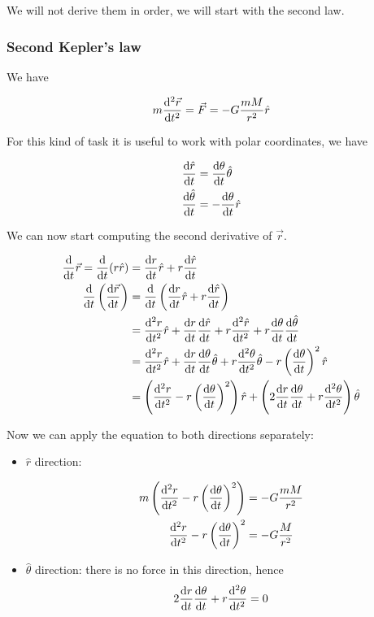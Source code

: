 \documentclass[10pt]{extarticle}
\begin{document}
We will not derive them in order, we will start with the second law.

\subsubsection{Second Kepler's law}

We have

$$
    m \dv[2]{\vec r}{t} = \vec F = - G \frac{m M}{r^2} \hat r
$$

For this kind of task it is useful to work with polar coordinates, we have

\begin{align*}
    \dv{\hat r}{t}       & = \dv{\theta}{t} \hat \theta \\
    \dv {\hat \theta}{t} & = - \dv{\theta}{t} \hat r
\end{align*}

We can now start computing the second derivative of $\vec r$.

\begin{align*}
    \dv{t} \vec{r} = \dv{t} (r \hat r) & = \dv{r}{t} \hat r + r \dv{\hat r}{t}                                                                                                            \\
    \dv{t}\left(\dv{\vec{r}}{t}\right) & = \dv{t}\left(\dv{r}{t} \hat r + r \dv{\hat r}{t}\right)                                                                                         \\
                                       & = \dv[2]{r}{t} \hat r + \dv{r}{t} \dv{\hat r}{t} + r \dv[2]{\hat r}{t} + r \dv{\theta}{t} \dv{\hat \theta}{t}                                    \\
                                       & = \dv[2]{r}{t} \hat r + \dv{r}{t} \dv{\theta}{t} \hat \theta + r \dv[2]{\theta}{t} \hat \theta - r \left(\dv{\theta}{t}\right)^2 \hat r          \\
                                       & = \left(\dv[2]{r}{t} - r \left(\dv{\theta}{t}\right)^2\right) \hat r + \left(2 \dv{r}{t} \dv{\theta}{t} + r \dv[2]{\theta}{t}\right) \hat \theta
\end{align*}

Now we can apply the equation to both directions separately:

\begin{itemize}
    \item $\hat r$ direction:

          \begin{align*}
              m \left(\dv[2]{r}{t} - r \left(\dv{\theta}{t}\right)^2\right) & = - G \frac{m M}{r^2} \\
              \dv[2]{r}{t} - r \left(\dv{\theta}{t}\right)^2                & = - G \frac{M}{r^2}
          \end{align*}
    \item $\hat \theta$ direction: there is no force in this direction, hence
          $$
              2 \dv{r}{t} \dv{\theta}{t} + r \dv[2]{\theta}{t} = 0
          $$
\end{itemize}
\end{document}
